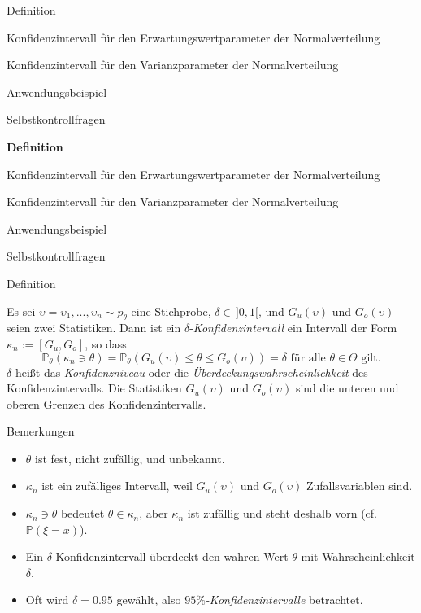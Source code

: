 \documentclass[
  8pt,
  ignorenonframetext,
]{beamer}
\providecommand{\tightlist}{%
  \setlength{\itemsep}{0pt}\setlength{\parskip}{0pt}}
\newcommand{\ups} {\upsilon}
\begin{document}
\begin{frame}{}
\protect\hypertarget{section-5}{}
\large

Definition

Konfidenzintervall für den Erwartungswertparameter der Normalverteilung

Konfidenzintervall für den Varianzparameter der Normalverteilung

Anwendungsbeispiel

Selbstkontrollfragen
\end{frame}

\begin{frame}{}
\protect\hypertarget{section-6}{}
\large

\textbf{Definition}

Konfidenzintervall für den Erwartungswertparameter der Normalverteilung

Konfidenzintervall für den Varianzparameter der Normalverteilung

Anwendungsbeispiel

Selbstkontrollfragen
\end{frame}

\begin{frame}{Definition}
\protect\hypertarget{definition}{}
\small
\begin{definition}
\justifying
Es sei $\ups = \ups_1,...,\ups_n \sim p_\theta$ eine Stichprobe, $\delta \in \,]0,1[$,
und $G_u(\ups)$ und $G_o(\ups)$ seien zwei Statistiken. Dann ist ein
$\delta$-\textit{Konfidenzintervall} ein Intervall der Form $\kappa_n := [G_u, G_o]$, so dass
\begin{equation}
\mathbb{P}_\theta\left(\kappa_n \ni \theta\right) =
\mathbb{P}_\theta\left(G_u(\ups) \le \theta \le G_o(\ups) \right) =
\delta \mbox{ für alle } \theta \in \Theta \mbox{ gilt}.
\end{equation}
$\delta$ heißt das \textit{Konfidenzniveau} oder die \textit{Überdeckungswahrscheinlichkeit}
des Konfidenzintervalls. Die Statistiken $G_u(\ups)$ und $G_o(\ups)$ sind die unteren
und oberen Grenzen des Konfidenzintervalls.
\end{definition}

\footnotesize

Bemerkungen

\begin{itemize}
\tightlist
\item
  \(\theta\) ist fest, nicht zufällig, und unbekannt.
\item
  \(\kappa_n\) ist ein zufälliges Intervall, weil \(G_u(\ups)\) und
  \(G_o(\ups)\) Zufallsvariablen sind.
\item
  \(\kappa_n \ni \theta\) bedeutet \(\theta \in \kappa_n\), aber
  \(\kappa_n\) ist zufällig und steht deshalb vorn
  (cf.~\(\mathbb{P}(\xi = x)\)).
\item
  Ein \(\delta\)-Konfidenzintervall überdeckt den wahren Wert \(\theta\)
  mit Wahrscheinlichkeit \(\delta\).
\item
  Oft wird \(\delta = 0.95\) gewählt, also
  \textit{$95\%$-Konfidenzintervalle} betrachtet.
\end{itemize}
\end{frame}
\end{document}
